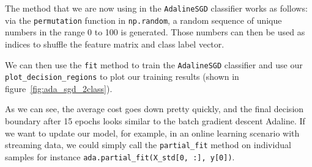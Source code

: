 \documentclass[11pt]{article}
\begin{document}
    The  method that we are now using in the \texttt{AdalineSGD} classifier works as follows: via the \texttt{permutation} function in \texttt{np.random}, a random sequence of unique numbers in the range 0 to 100 is generated.
    Those numbers can then be used as indices to shuffle the feature matrix and class label vector.

    We can then use the \texttt{fit} method to train the \texttt{AdalineSGD} classifier and use our \texttt{plot\_decision\_regions} to plot our training results (shown in figure~\ref{fig:ada_sgd_2class}).

    As we can see, the average cost goes down pretty quickly, and the final decision boundary after 15 epochs looks similar to the batch gradient descent Adaline.
    If we want to update our model, for example, in an online learning scenario with streaming data, we could simply call the \texttt{partial\_fit} method on individual samples \textemdash for instance \texttt{ada.partial\_fit(X\_std[0, :], y[0])}.

    \medskip
    
    
\end{document}
